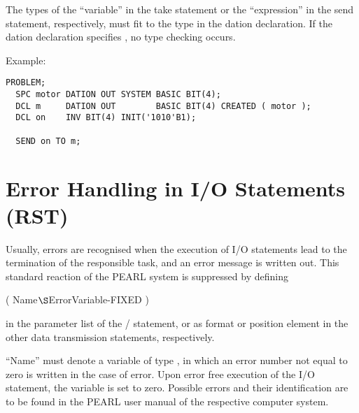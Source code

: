 The types of the ``variable'' in the take statement or the
``expression'' in the send statement, respectively, must fit to 
the type in the dation declaration. If the dation declaration 
specifies , no type checking occurs.


Example:


\begin{lstlisting}
PROBLEM;
  SPC motor DATION OUT SYSTEM BASIC BIT(4);
  DCL m     DATION OUT        BASIC BIT(4) CREATED ( motor );
  DCL on    INV BIT(4) INIT('1010'B1);

  SEND on TO m;
\end{lstlisting}

\section{Error Handling in I/O Statements (RST)}    %
\label{sec_dation_rst}

Usually, errors are recognised when the execution of I/O statements lead to the
termination of the responsible task, and an error message is written
out. This standard reaction of the PEARL system is suppressed by
defining

 ( Name$\S $ErrorVariable-FIXED )

in the parameter list of the / statement, or as format or
position element in the other data transmission statements,
respectively.

``Name'' must denote a variable of type , in which an error number
not equal to zero is written in the case of error. Upon error free
execution of the I/O statement, the variable is set to zero. Possible
errors and their identification are to be found in the PEARL user manual
of the respective computer system.

